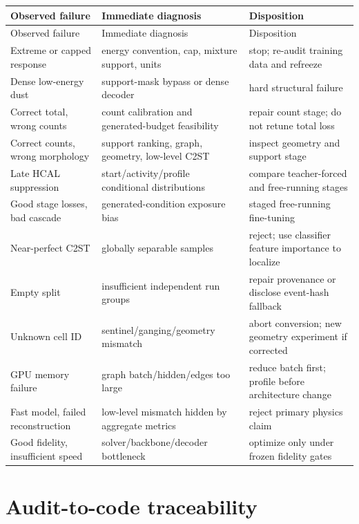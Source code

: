 \documentclass[10pt,a4paper]{article}
\begin{document}
\begin{longtable}{@{}p{}p{}p{}@{}}
\toprule
Observed failure & Immediate diagnosis & Disposition \\
\midrule
\endfirsthead
\toprule
Observed failure & Immediate diagnosis & Disposition \\
\midrule
\endhead
Extreme or capped response & energy convention, cap, mixture support, units & stop; re-audit training data and refreeze \\
Dense low-energy dust & support-mask bypass or dense decoder & hard structural failure \\
Correct total, wrong counts & count calibration and generated-budget feasibility & repair count stage; do not retune total loss \\
Correct counts, wrong morphology & support ranking, graph, geometry, low-level C2ST & inspect geometry and support stage \\
Late HCAL suppression & start/activity/profile conditional distributions & compare teacher-forced and free-running stages \\
Good stage losses, bad cascade & generated-condition exposure bias & staged free-running fine-tuning \\
Near-perfect C2ST & globally separable samples & reject; use classifier feature importance to localize \\
Empty split & insufficient independent run groups & repair provenance or disclose event-hash fallback \\
Unknown cell ID & sentinel/ganging/geometry mismatch & abort conversion; new geometry experiment if corrected \\
GPU memory failure & graph batch/hidden/edges too large & reduce batch first; profile before architecture change \\
Fast model, failed reconstruction & low-level mismatch hidden by aggregate metrics & reject primary physics claim \\
Good fidelity, insufficient speed & solver/backbone/decoder bottleneck & optimize only under frozen fidelity gates \\
\bottomrule
\end{longtable}

\section{Audit-to-code traceability}
\end{document}
